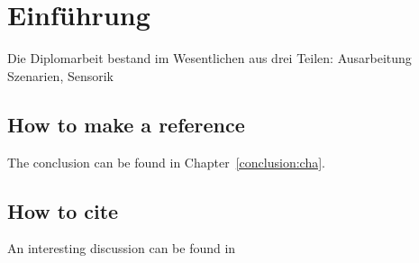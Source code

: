 \chapter{Einf\"uhrung}
\label{introduction:cha}

Die Diplomarbeit bestand im Wesentlichen aus drei Teilen:
Ausarbeitung Szenarien, Sensorik

\section{How to make a reference}
The conclusion can
be found in Chapter~\ref{conclusion:cha}.

\section{How to cite}
An interesting discussion can be found in \cite{Tsutsui/Gosh:1997}

